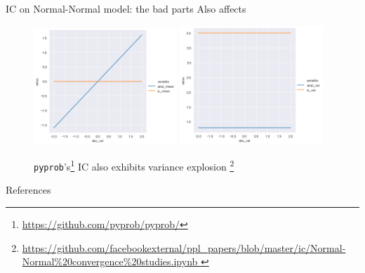 \documentclass{beamer}
\begin{document}
\begin{frame}[fragile]{IC on Normal-Normal model: the bad parts}
    Also affects \cite{le2017inference}
    \begin{figure}
        \centering
        \includegraphics[width=0.48\textwidth]{figures/ic-smc-fail.png}
        \includegraphics[width=0.48\textwidth]{figures/ic-smc-fail-var.png}
        \caption{\texttt{pyprob}'s\footnote{\tiny\url{https://github.com/pyprob/pyprob/}} IC also exhibits variance explosion
        \footnote{\tiny\url{https://github.com/facebookexternal/ppl_papers/blob/master/ic/Normal-Normal\%20convergence\%20studies.ipynb
        }}}
    \end{figure}
\end{frame}

\begin{frame}[allowframebreaks]{References}

  
  

\end{frame}
\end{document}

